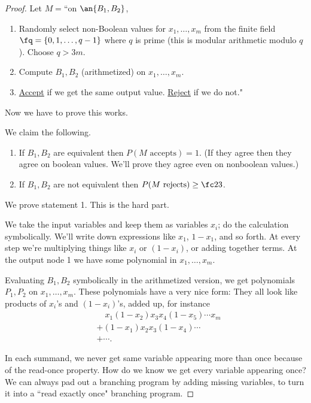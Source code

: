 \begin{proof}
Let $M=$``on $\an{B_1,B_2}$,
\begin{enumerate}
\item
Randomly select non-Boolean values for $x_1,\ldots, x_m$ from the finite field $\fq=\{0,1,\ldots, q-1\}$ where $q$ is prime (this is modular arithmetic modulo $q$). Choose $q>3m$.
\item
Compute $B_1,B_2$ (arithmetized) on $x_1,\ldots, x_m$.
\item
\ul{Accept} if we get the same output value.
\ul{Reject} if we do not."
\end{enumerate}
Now we have to prove this works.

We claim the following.
\begin{enumerate}
\item
If $B_1,B_2$ are equivalent then $P(M\text{ accepts})=1$.
(If they agree then they agree on boolean values. We'll prove they agree even on nonboolean values.)
\item
If $B_1,B_2$ are not equivalent then $P(M\text{ rejects})\ge \fc 23$.
\end{enumerate}
We prove statement 1. This is the hard part.

We take the input variables and keep them as variables $x_i$; do the calculation symbolically. %
We'll write down expressions like $x_1$, $1-x_1$, and so forth. At every step we're multiplying things like $x_i$ or $(1-x_i)$, or adding together terms. %
At the output node 1 we have some polynomial in $x_1,\ldots, x_m$. 

Evaluating $B_1, B_2$ symbolically in the arithmetized version, we get polynomials $P_1,P_2$ on $x_1,\ldots, x_m$. These polynomials have a very nice form: They all look like products of $x_i$'s and $(1-x_i)$'s, added up, for instance %
\begin{align*}
&\quad x_1(1-x_2)x_3x_4(1-x_5)\cdots x_m\\
&+ (1-x_1)x_2x_3(1-x_4)\cdots \\
&+\cdots.\end{align*}

In each summand, we never get same variable appearing more than once because of the read-once property. %
How do we know we get every variable appearing once? We can always pad out a branching program by adding missing variables, to turn it into a ``read exactly once" branching program. %


\end{proof}
